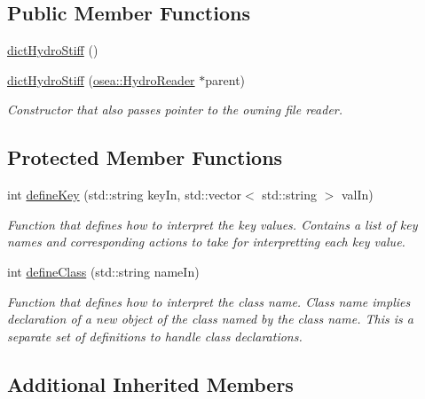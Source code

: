 \subsection*{Public Member Functions}
\begin{DoxyCompactItemize}
\item 
\hyperlink{classosea_1_1dict_hydro_stiff_aa77b4351a36cf9b2a1b419256b32d56a}{dict\-Hydro\-Stiff} ()
\item 
\hyperlink{classosea_1_1dict_hydro_stiff_a1c1114ac52525b6a096d1018778f1be5}{dict\-Hydro\-Stiff} (\hyperlink{classosea_1_1_hydro_reader}{osea\-::\-Hydro\-Reader} $\ast$parent)
\begin{DoxyCompactList}\small\item\em Constructor that also passes pointer to the owning file reader. \end{DoxyCompactList}\end{DoxyCompactItemize}
\subsection*{Protected Member Functions}
\begin{DoxyCompactItemize}
\item 
int \hyperlink{classosea_1_1dict_hydro_stiff_a5753996351c5de5b30cd3208bbefa5c5}{define\-Key} (std\-::string key\-In, std\-::vector$<$ std\-::string $>$ val\-In)
\begin{DoxyCompactList}\small\item\em Function that defines how to interpret the key values. Contains a list of key names and corresponding actions to take for interpretting each key value. \end{DoxyCompactList}\item 
int \hyperlink{classosea_1_1dict_hydro_stiff_a6d9ff49c8fcc8cbd81d0722e5195af6b}{define\-Class} (std\-::string name\-In)
\begin{DoxyCompactList}\small\item\em Function that defines how to interpret the class name. Class name implies declaration of a new object of the class named by the class name. This is a separate set of definitions to handle class declarations. \end{DoxyCompactList}\end{DoxyCompactItemize}
\subsection*{Additional Inherited Members}


